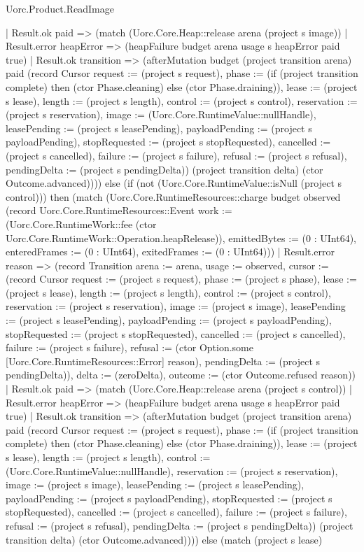 \begin{lexlean}{Uorc.Product.ReadImage}
\begin{semanticmodule}
{          | Result.ok paid => (match (Uorc.Core.Heap::release arena (project s image))
            | Result.error heapError => (heapFailure budget arena usage s heapError paid true)
            | Result.ok transition => (afterMutation budget (project transition arena) paid (record Cursor {request := (project s request), phase := (if (project transition complete) then (ctor Phase.cleaning) else (ctor Phase.draining)), lease := (project s lease), length := (project s length), control := (project s control), reservation := (project s reservation), image := (Uorc.Core.RuntimeValue::nullHandle), leasePending := (project s leasePending), payloadPending := (project s payloadPending), stopRequested := (project s stopRequested), cancelled := (project s cancelled), failure := (project s failure), refusal := (project s refusal), pendingDelta := (project s pendingDelta)}) (project transition delta) (ctor Outcome.advanced)))) else (if (not (Uorc.Core.RuntimeValue::isNull (project s control))) then (match (Uorc.Core.RuntimeResources::charge budget observed (record Uorc.Core.RuntimeResources::Event {work := (Uorc.Core.RuntimeWork::fee (ctor Uorc.Core.RuntimeWork::Operation.heapRelease)), emittedBytes := (0 : UInt64), enteredFrames := (0 : UInt64), exitedFrames := (0 : UInt64)}))
          | Result.error reason => (record Transition {arena := arena, usage := observed, cursor := (record Cursor {request := (project s request), phase := (project s phase), lease := (project s lease), length := (project s length), control := (project s control), reservation := (project s reservation), image := (project s image), leasePending := (project s leasePending), payloadPending := (project s payloadPending), stopRequested := (project s stopRequested), cancelled := (project s cancelled), failure := (project s failure), refusal := (ctor Option.some [Uorc.Core.RuntimeResources::Error] reason), pendingDelta := (project s pendingDelta)}), delta := (zeroDelta), outcome := (ctor Outcome.refused reason)})
          | Result.ok paid => (match (Uorc.Core.Heap::release arena (project s control))
            | Result.error heapError => (heapFailure budget arena usage s heapError paid true)
            | Result.ok transition => (afterMutation budget (project transition arena) paid (record Cursor {request := (project s request), phase := (if (project transition complete) then (ctor Phase.cleaning) else (ctor Phase.draining)), lease := (project s lease), length := (project s length), control := (Uorc.Core.RuntimeValue::nullHandle), reservation := (project s reservation), image := (project s image), leasePending := (project s leasePending), payloadPending := (project s payloadPending), stopRequested := (project s stopRequested), cancelled := (project s cancelled), failure := (project s failure), refusal := (project s refusal), pendingDelta := (project s pendingDelta)}) (project transition delta) (ctor Outcome.advanced)))) else (match (project s lease)
}
\end{semanticmodule}
\end{lexlean}

